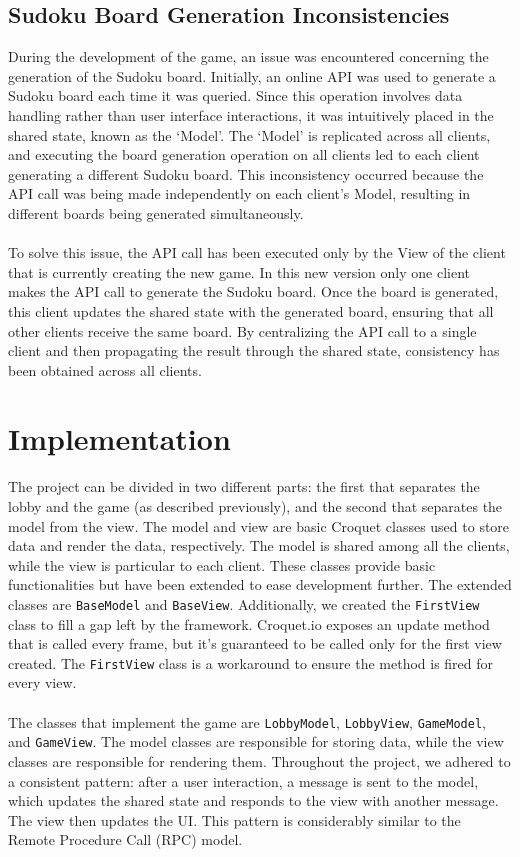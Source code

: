 \documentclass[12pt, a4paper]{report}
\begin{document}
\section{Sudoku Board Generation Inconsistencies}
During the development of the game, an issue was encountered concerning the generation of the Sudoku board. Initially, an online API was used to generate a Sudoku board each time it was queried. Since this operation involves data handling rather than user interface interactions, it was intuitively placed in the shared state, known as the `Model'. The `Model' is replicated across all clients, and executing the board generation operation on all clients led to each client generating a different Sudoku board. This inconsistency occurred because the API call was being made independently on each client's Model, resulting in different boards being generated simultaneously.\\
\\
To solve this issue, the API call has been executed only by the View of the client that is currently creating the new game. In this new version only one client makes the API call to generate the Sudoku board. Once the board is generated, this client updates the shared state with the generated board, ensuring that all other clients receive the same board. By centralizing the API call to a single client and then propagating the result through the shared state, consistency has been obtained across all clients.

\chapter{Implementation}
The project can be divided in two different parts: the first that separates the lobby and the game (as described previously), and the second that separates the model from the view. The model and view are basic Croquet classes used to store data and render the data, respectively. The model is shared among all the clients, while the view is particular to each client. These classes provide basic functionalities but have been extended to ease development further. The extended classes are \texttt{BaseModel} and \texttt{BaseView}. Additionally, we created the \texttt{FirstView} class to fill a gap left by the framework. Croquet.io exposes an update method that is called every frame, but it's guaranteed to be called only for the first view created. The \texttt{FirstView} class is a workaround to ensure the method is fired for every view.\\
\\
The classes that implement the game are \texttt{LobbyModel}, \texttt{LobbyView}, \texttt{GameModel}, and \texttt{GameView}. The model classes are responsible for storing data, while the view classes are responsible for rendering them. Throughout the project, we adhered to a consistent pattern: after a user interaction, a message is sent to the model, which updates the shared state and responds to the view with another message. The view then updates the UI. This pattern is considerably similar to the Remote Procedure Call (RPC) model.
\end{document}
